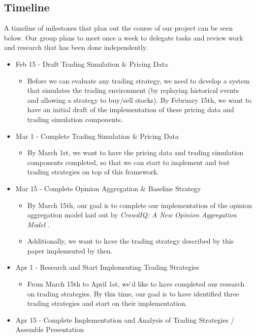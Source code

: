 \subsection{Timeline}

A timeline of milestones that plan out the course of our project can be seen below. Our group plans to meet once a week to delegate tasks and review work and research that has been done independently.

\begin{itemize}
\item Feb 15 - Draft Trading Simulation \& Pricing Data
  \begin{itemize}
    \item Before we can evaluate any trading strategy, we need to develop a system that simulates the trading environment (by replaying historical events and allowing a strategy to buy/sell stocks). By February 15th, we want to have an initial draft of the implementation of these pricing data and trading simulation components.
  \end{itemize}
\item Mar 1 - Complete Trading Simulation \& Pricing Data
  \begin{itemize}
  \item By March 1st, we want to have the pricing data and trading simulation components completed, so that we can start to implement and test trading strategies on top of this framework.
  \end{itemize}
\item Mar 15 - Complete Opinion Aggregation \& Baseline Strategy
  \begin{itemize}
  \item By March 15th, our goal is to complete our implementation of the opinion aggregation model laid out by \textit{CrowdIQ: A New Opinion Aggregation Model} \cite{crowdiq}.
  \item Additionally, we want to have the trading strategy described by this paper implemented by then.
  \end{itemize}
\item Apr 1 - Research and Start Implementing Trading Strategies
  \begin{itemize}
  \item From March 15th to April 1st, we'd like to have completed our research on trading strategies. By this time, our goal is to have identified three trading strategies and start on their implementation.
  \end{itemize}
\item Apr 15 - Complete Implementation and Analysis of Trading Strategies / Assemble Presentation

\end{itemize}
